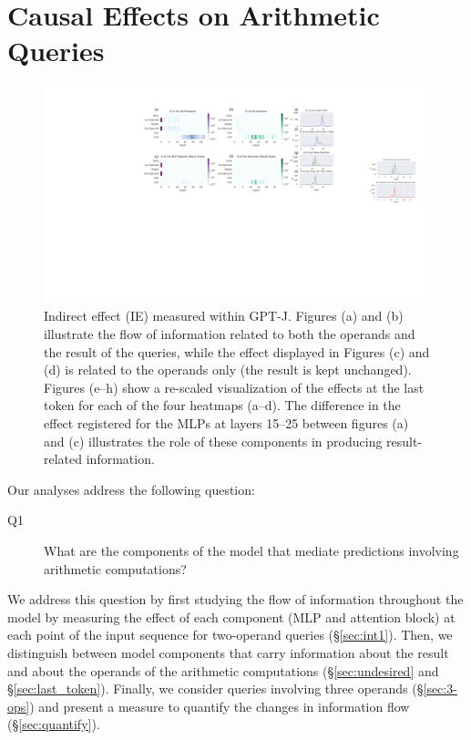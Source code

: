 \documentclass[11pt]{article}
\begin{document}
\section{Causal Effects on Arithmetic Queries}

\begin{figure}[t]
    \centering
    \includegraphics[width=\textwidth]{img/main_res.pdf}
    \caption{Indirect effect (IE) measured within GPT-J. Figures (a) and (b) illustrate the flow of information related to both the operands and the result of the queries, while the effect displayed in Figures (c) and (d) is related to the operands only (the result is kept unchanged). Figures (e--h) show a re-scaled visualization of the effects at the last token for each of the four heatmaps (a--d). The difference in the effect registered for the MLPs at layers 15--25 between figures (a) and (c) illustrates the role of these components in producing result-related information.}
    \label{fig:j-heatmaps}
\end{figure}

Our analyses address the following question:
\begin{description}
    \item[Q1] What are the components of the model that mediate predictions involving arithmetic computations?
\end{description}
We address this question by first studying the flow of information throughout the model by measuring the effect of each component (MLP and attention block) at each point of the input sequence for two-operand queries (\S \ref{sec:int1}). Then, we distinguish between model components that carry information about the result and about the operands of the arithmetic computations (\S \ref{sec:undesired} and \S\ref{sec:last_token}). Finally, we consider queries involving three operands (\S \ref{sec:3-ops}) and present a measure to quantify the changes in information flow (\S \ref{sec:quantify}).
\end{document}
